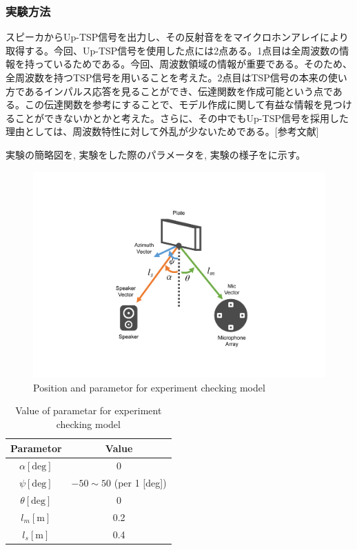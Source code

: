 \clearpage

\subsubsection{実験方法}
スピーカからUp-TSP信号を出力し、その反射音ををマイクロホンアレイにより取得する。今回、Up-TSP信号を使用した点には2点ある。1点目は全周波数の情報を持っているためである。今回、周波数領域の情報が重要である。そのため、全周波数を持つTSP信号を用いることを考えた。2点目はTSP信号の本来の使い方であるインパルス応答を見ることができ、伝達関数を作成可能という点である。この伝達関数を参考にすることで、モデル作成に関して有益な情報を見つけることができないかとかと考えた。さらに、その中でもUp-TSP信号を採用した理由としては、周波数特性に対して外乱が少ないためである。[参考文献]

実験の簡略図を, 実験をした際のパラメータを, 
実験の様子をに示す。

\begin{figure}[ht]
  \begin{center}
  \vspace{1zh}
    \includegraphics[width=0.55\linewidth]{images/3_exp_pos_para.pdf}  
  \end{center}
  \caption{Position and parametor for experiment checking model}
  \label{fig:exp_pos_para}
\end{figure}

\begin{table}[ht]
    \centering
    \caption{Value of parametar for experiment checking model}
    \begin{tabular}{c|c}\hline
        Parametor & Value \\ \hline\hline
        $\alpha [\mathrm{deg}]$ & 0 \\ \hline
        $\psi [\mathrm{deg}]$ & $-50 \sim 50$ (per 1 [deg])\\ \hline
        $\theta [\mathrm{deg}]$ & 0 \\ \hline
        $l_m [\mathrm{m}]$ & 0.2 \\ \hline
        $l_s [\mathrm{m}]$ & 0.4 \\ \hline
    \end{tabular}
    \label{tab:exp_para}
\end{table}

